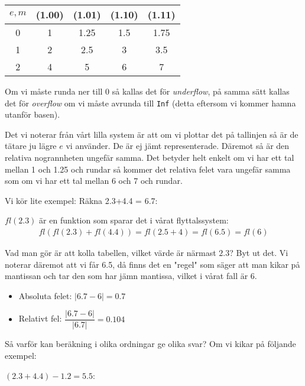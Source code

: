 \begin{center}
  \begin{tabular}{|c|c|c|c|c|}
    \hline
    $e,m$&(1.00)&(1.01)&(1.10)&(1.11)\\
    \hline
    0&1&1.25&1.5&1.75\\
    \hline
    1&2&2.5&3&3.5\\
    \hline
    2&4&5&6&7\\
    \hline
  \end{tabular}
\end{center}
\par\bigskip
\noindent Om vi måste runda ner till 0 så kallas det för \textit{underflow}, på samma sätt kallas det för \textit{overflow} om vi måste avrunda till \texttt{Inf} (detta eftersom vi kommer hamna utanför basen).
\par\bigskip
\noindent Det vi noterar från vårt lilla system är att om vi plottar det på tallinjen så är de tätare ju lägre $e$ vi använder. De är ej jämt representerade. Däremot så är den relativa nogrannheten ungefär samma. Det betyder helt enkelt om vi har ett tal mellan 1 och 1.25 och rundar så kommer det relativa felet vara ungefär samma som om vi har ett tal mellan 6 och 7 och rundar.
\par\bigskip
\noindent Vi kör lite exempel: Räkna 2.3+4.4 = 6.7:
\par\bigskip
\noindent $fl(2.3)$ är en funktion som sparar det i vårat flyttalssystem:
\begin{equation*}
  \begin{gathered}
    fl(fl(2.3)+fl(4.4))=fl(2.5+4) = fl(6.5) = fl(6)
  \end{gathered}
\end{equation*}
\par\bigskip
\noindent Vad man gör är att kolla tabellen, vilket värde är närmast $2.3$? Byt ut det. Vi noterar däremot att vi får 6.5, då finns det en "regel" som säger att man kikar på mantissan och tar den som har jämn mantissa, vilket i vårat fall är 6.
\begin{itemize}
  \item Absoluta felet: $\left|6.7-6\right| = 0.7$
  \item Relativt fel: $\dfrac{\left|6.7-6\right|}{\left|6.7\right|} = 0.104$
\end{itemize}
\par\bigskip
\noindent Så varför kan beräkning i olika ordningar ge olika svar? Om vi kikar på följande exempel:\par
\noindent $(2.3+4.4)-1.2 = 5.5$:
